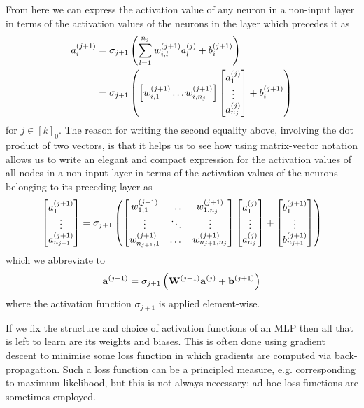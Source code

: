 \documentclass[11pt]{article}
\begin{document}
\noindent From here we can express the activation value of any neuron in a non-input layer in terms of the activation values of the neurons in the layer which precedes it as
\begin{align*}
    a_i^{(j+1)}
    &=
    \sigma_{j+1}\left(
    \sum_{l=1}^{n_j} w_{i,l}^{(j+1)}a_l^{(j)} + b_i^{(j+1)}
    \right)\\
    &=
    \sigma_{j+1}\left(
    \left[w_{i,1}^{(j+1)} \dots w_{i,n_j}^{(j+1)}\right]
    \begin{bmatrix}
        a_1^{(j)}\\
        \vdots\\
        a_{n_j}^{(j)}
    \end{bmatrix}
    +
    b_i^{(j+1)}
\right)
\end{align*}
for $j\in[k]_0$. The reason for writing the second equality above, involving the dot product of two vectors, is that it helps us to see how using matrix-vector notation allows us to write an elegant and compact expression for the activation values of all nodes in a non-input layer in terms of the activation values of the neurons belonging to its preceding layer as
$$
\begin{bmatrix}
    a_1^{(j+1)}\\
    \vdots\\
    a_{n_{j+1}}^{(j+1)}
\end{bmatrix}
=
\sigma_{j+1}\left(
\begin{bmatrix}
    w_{1,1}^{(j+1)} & \dots & w_{1,n_j}^{(j+1)}\\
    \vdots & \ddots & \vdots\\
    w_{n_{j+1},1}^{(j+1)} & \dots & w_{n_{j+1},n_j}^{(j+1)}
\end{bmatrix}
\begin{bmatrix}
    a_1^{(j)}\\
    \vdots\\
    a_{n_j}^{(j)}
\end{bmatrix}
+
\begin{bmatrix}
    b_1^{(j+1)}\\
    \vdots\\
    b_{n_{j+1}}^{(j+1)}
\end{bmatrix}
\right)
$$
which we abbreviate to
$$
\mathbf{a}^{(j+1)}=\sigma_{j+1}\left(\mathbf{W}^{(j+1)}\mathbf{a}^{(j)}+\mathbf{b}^{(j+1)}\right)
$$
where the activation function $\sigma_{j+1}$ is applied element-wise.

If we fix the structure and choice of activation functions of an MLP then all that is left to learn are its weights and biases. This is often done using gradient descent to minimise some loss function in which gradients are computed via back-propagation. Such a loss function can be a principled measure, e.g. corresponding to maximum likelihood, but this is not always necessary: ad-hoc loss functions are sometimes employed.
\end{document}
